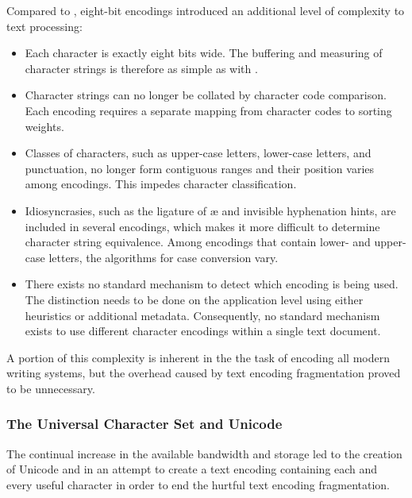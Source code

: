 \documentclass{book}
\begin{document}

Compared to , eight-bit encodings introduced an additional level
of complexity to text processing:
\begin{itemize}
  \item Each character is exactly eight bits wide. The buffering and measuring
    of character strings is therefore as simple as with .
  \item Character strings can no longer be collated by character code
    comparison. Each encoding requires a separate mapping from character codes
    to sorting weights.
  \item Classes of characters, such as upper-case letters, lower-case letters,
    and punctuation, no longer form contiguous ranges and their position varies
    among encodings. This impedes character classification.
  \item Idiosyncrasies, such as the ligature of æ and invisible hyphenation
    hints, are included in several encodings, which makes it more difficult to
    determine character string equivalence. Among encodings that contain lower-
    and upper-case letters, the algorithms for case conversion vary.
  \item There exists no standard mechanism to detect which encoding is being
    used. The distinction needs to be done on the application level using either
    heuristics or additional metadata. Consequently, no standard mechanism
    exists to use different character encodings within a single text document.
\end{itemize}
A portion of this complexity is inherent in the the task of encoding all modern
writing systems, but the overhead caused by text encoding fragmentation proved
to be unnecessary.

\subsubsection{The Universal Character Set and Unicode}
The continual increase in the available bandwidth and storage led to the
creation of Unicode \cite{unicode91,unicode92} and  \cite{iso93} in
an attempt to create a text encoding containing each and every useful character
in order to end the hurtful text encoding fragmentation.

\end{document}
